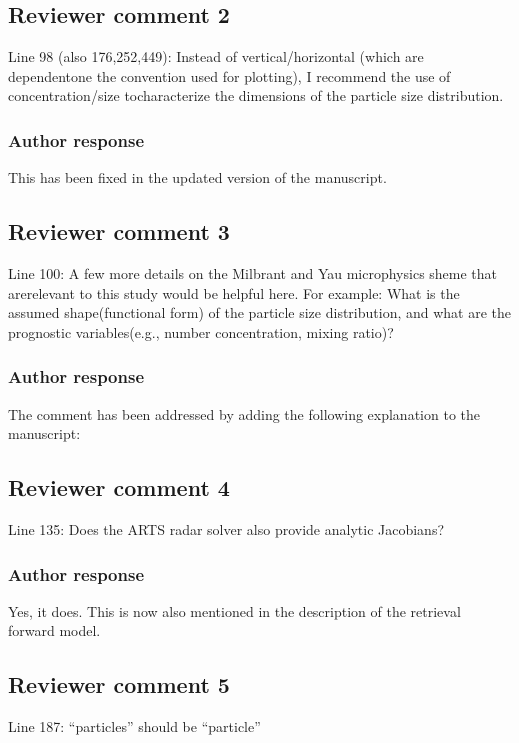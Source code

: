 \documentclass[11pt]{scrartcl}
\begin{document}
\subsection*{Reviewer comment 2}
Line  98  (also  176,252,449):  Instead  of  vertical/horizontal  (which  are  dependentone the convention used for plotting), I recommend the use of concentration/size tocharacterize the dimensions of the particle size distribution.

\subsubsection*{Author response}
This has been fixed in the updated version of the manuscript.

\subsection*{Reviewer comment 3}

Line 100: A few more details on the Milbrant and Yau microphysics sheme that arerelevant to this study would be helpful here. For example: What is the assumed shape(functional form) of the particle size distribution, and what are the prognostic variables(e.g., number concentration, mixing ratio)?

\subsubsection*{Author response}

The comment has been addressed by adding the following explanation to the manuscript:


\subsection*{Reviewer comment 4}
Line 135: Does the ARTS radar solver also provide analytic Jacobians?

\subsubsection*{Author response}
Yes, it does. This is now also mentioned in the description of the retrieval forward model.

\subsection*{Reviewer comment 5}
Line 187: “particles” should be “particle”
\end{document}
